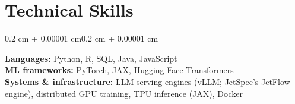 \documentclass[10pt, letterpaper]{article}
\newenvironment{onecolentry}{
    \begin{adjustwidth}{0.2 cm + 0.00001 cm}{0.2 cm + 0.00001 cm}
}{\end{adjustwidth}}
\begin{document}
    \section{Technical Skills}

    \begin{onecolentry}
        \textbf{Languages:} Python, R, SQL, Java, JavaScript\\[2pt]
        \textbf{ML frameworks:} PyTorch, JAX, Hugging Face Transformers\\[2pt]
        \textbf{Systems \& infrastructure:} LLM serving engines (vLLM; JetSpec's JetFlow engine), distributed GPU training, TPU inference (JAX), Docker
    \end{onecolentry}
\end{document}
